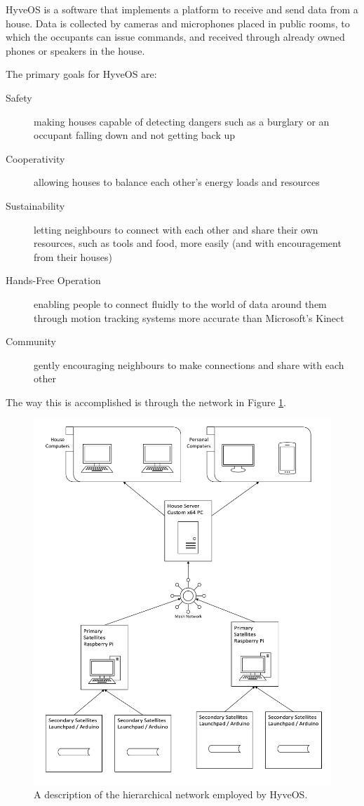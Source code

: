 	HyveOS is a software that implements a platform to receive and send data from a house. 
	Data is collected by cameras and microphones placed in public rooms, to which the occupants can issue commands, and received through already owned phones or speakers in the house.
	
	The primary goals for HyveOS are:
	\begin{description}
		\item[Safety] making houses capable of detecting dangers such as a burglary or an occupant falling down and not getting back up
		\item[Cooperativity] allowing houses to balance each other's energy loads and resources
		\item[Sustainability] letting neighbours to connect with each other and share their own resources, such as tools and food, more easily (and with encouragement from their houses)
		\item[Hands-Free Operation] enabling people to connect fluidly to the world of data around them through motion tracking systems more accurate than Microsoft's Kinect
		\item[Community] gently encouraging neighbours to make connections and share with each other
	\end{description}
	
	The way this is accomplished is through the network in Figure \ref{data-summary}.
	
	\begin{figure}
		\centering
		\includegraphics[width=.7\textwidth]{gfx/hyvedev-data-summary.pdf}
		\caption{A description of the hierarchical network employed by HyveOS.}
		\label{data-summary}
	\end{figure}

